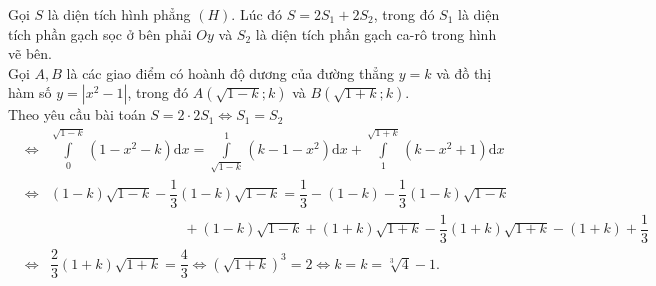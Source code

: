 \begin{ex}
{\begin{center}
		\end{center}
	Gọi $S$ là diện tích hình phẳng $(H)$. Lúc đó $S=2S_1+2S_2$, trong đó $S_1$
	là diện tích phần gạch sọc ở bên phải $Oy$ và $S_2$ là diện tích phần gạch ca-rô trong hình vẽ bên.\\
	Gọi $A, B$ là các giao điểm có hoành độ dương của đường thẳng $y=k$ và đồ thị hàm số $y=|x^2-1|$, trong đó $A(\sqrt{1-k};k)$ và $B(\sqrt{1+k};k)$.\\
	Theo yêu cầu bài toán $S=2\cdot 2S_1 \Leftrightarrow S_1=S_2$
	\begin{eqnarray*}
		&\Leftrightarrow &	\displaystyle\int\limits_{0}^{\sqrt{1-k}}(1-x^2-k)\mathrm{d}x=\displaystyle\int\limits_{\sqrt{1-k}}^1(k-1-x^2)\mathrm{d}x+\displaystyle\int\limits_{1}^{\sqrt{1+k}}(k-x^2+1)\mathrm{d}x \\
		&\Leftrightarrow & (1-k)\sqrt{1-k}-\dfrac{1}{3}(1-k)\sqrt{1-k}=\dfrac{1}{3}-(1-k)-\dfrac{1}{3}(1-k)\sqrt{1-k}\\ 
		& & \hspace{4cm}+(1-k)\sqrt{1-k}+(1+k)\sqrt{1+k}-\dfrac{1}{3}(1+k)\sqrt{1+k}-(1+k)+\dfrac{1}{3}\\
		&\Leftrightarrow & \dfrac{2}{3}(1+k)\sqrt{1+k}=\dfrac{4}{3} \Leftrightarrow \left(\sqrt{1+k}\right)^3=2 \Leftrightarrow k=k=\sqrt[3]{4}-1.
	\end{eqnarray*}
	}
\end{ex}

